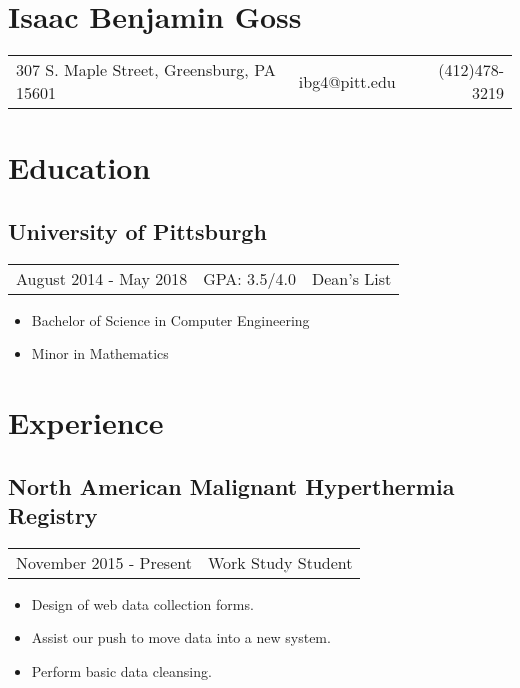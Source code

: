 \documentclass{article}
\begin{document}
  \section*{Isaac Benjamin Goss}
	\hrulefill
	
	\begin{tabular}{l | c | r}
	    307 S. Maple Street, Greensburg, PA 15601  & ibg4@pitt.edu & (412)478-3219 
	\end{tabular}
    
    
  \section*{Education}
    \subsection*{University of Pittsburgh}
      \begin{tabular}{l | c | r}
      	August 2014 - May 2018 & GPA: 3.5/4.0 & Dean's List
      \end{tabular}
      
      \begin{itemize}
        \item Bachelor of Science in Computer Engineering
        \item Minor in Mathematics
      \end{itemize}
      
  
  \section*{Experience}
    \subsection*{North American Malignant Hyperthermia Registry}
      \begin{tabular}{l | r}
      November 2015 - Present &
      Work Study Student
      \end{tabular}
      \begin{itemize}
        \item Design of web data collection forms.
        \item Assist our push to move data into a new system.
        \item Perform basic data cleansing.
      \end{itemize}
\end{document}
